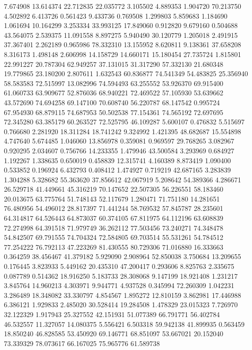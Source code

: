 7.674908
13.614374
22.712835
22.035772
3.105502
4.889353
1.904720
70.213750
4.502892
6.413726
0.561423
9.433736
0.769508
1.299803
5.859683
1.184690
1.061694
10.164299
3.253334
33.993125
17.849060
0.912820
9.679160
0.504688
43.564075
2.539375
11.091558
8.897275
5.940490
30.120779
1.205018
2.491915
37.367401
2.262189
0.965986
78.332310
13.155952
8.620811
9.138361
37.658208
8.316173
1.498148
2.606998
14.158729
14.660171
15.180454
27.735724
1.815801
22.991227
20.787304
62.949257
37.131015
31.317290
57.332130
21.680348
19.779865
23.180200
2.807611
1.632543
60.836877
74.541349
54.483825
25.356940
58.583583
72.515997
13.082996
74.594493
63.255552
53.926370
69.915400
61.060733
63.909677
52.876036
68.940221
72.469522
57.105930
53.639662
43.572690
74.694258
69.147100
70.608740
56.220787
68.147542
0.995724
67.954930
68.879115
74.687953
50.502538
77.154361
74.565192
72.697695
72.345280
63.385179
60.263527
72.525795
46.109287
5.600107
0.476832
5.515697
0.766680
2.281920
18.311284
18.741242
9.324992
1.421395
48.682687
15.554898
4.747640
5.674485
1.046060
13.856978
0.359081
0.969597
29.768265
3.082967
0.920295
2.034607
0.756766
14.233355
1.479946
43.500584
3.293969
0.684927
1.192267
1.338635
0.650019
0.458839
12.315741
4.160389
8.873419
1.090400
0.533852
0.196924
6.432793
0.408412
1.474927
0.719219
42.687165
3.283839
1.304288
5.328682
55.363620
37.856612
42.067919
5.208642
54.389366
4.286671
26.529718
41.449661
45.316219
70.147652
22.507305
56.226551
58.183460
20.013675
63.775764
51.748143
52.117679
1.280471
71.751180
14.281651
76.480956
54.496012
28.817397
71.441244
58.769532
57.845787
28.235601
64.314817
64.526443
64.873037
60.374105
67.811975
64.112196
63.608839
72.274998
64.391518
71.979749
36.262112
77.503456
73.240271
74.348478
54.842507
69.791555
74.704324
72.584805
69.703514
55.531261
54.784512
77.254222
76.792113
47.223269
81.430555
80.729306
71.016880
16.333663
0.364259
38.456467
41.379182
5.929090
2.908964
52.850038
3.750684
13.209655
0.176445
3.823933
5.449162
20.435310
47.200417
0.293606
8.825763
2.335675
0.087789
0.514362
18.916250
5.183733
28.308068
9.147199
18.921408
1.231217
3.845764
14.960213
4.303971
9.944771
4.937528
0.345994
72.260309
1.042231
3.286489
18.348082
33.330797
4.854567
1.895272
12.810159
3.862981
17.446988
6.386121
1.929833
2.485020
30.528414
19.284508
1.478329
23.015323
7.726970
32.122329
1.917943
25.327552
42.151931
51.077389
66.791771
56.402784
46.532557
11.327057
14.080375
5.556421
6.503318
59.942138
41.899935
0.563459
18.850240
46.828585
53.450920
69.146771
68.851097
53.667021
20.152040
73.339329
78.073617
66.167025
75.965776
61.589738

